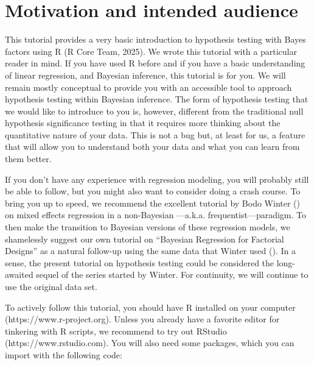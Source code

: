 \documentclass[
  doc,
  floatsintext,
  longtable,
  nolmodern,
  notxfonts,
  notimes,
  colorlinks=true,linkcolor=blue,citecolor=blue,urlcolor=blue]{apa7}
\begin{document}
\section{Motivation and intended
audience}\label{motivation-and-intended-audience}

This tutorial provides a very basic introduction to hypothesis testing
with Bayes factors using R (R Core Team, 2025). We wrote this tutorial
with a particular reader in mind. If you have used R before and if you
have a basic understanding of linear regression, and Bayesian inference,
this tutorial is for you. We will remain mostly conceptual to provide
you with an accessible tool to approach hypothesis testing within
Bayesian inference. The form of hypothesis testing that we would like to
introduce to you is, however, different from the traditional null
hypothesis significance testing in that it requires more thinking about
the quantitative nature of your data. This is not a bug but, at least
for us, a feature that will allow you to understand both your data and
what you can learn from them better.

If you don't have any experience with regression modeling, you will
probably still be able to follow, but you might also want to consider
doing a crash course. To bring you up to speed, we recommend the
excellent tutorial by Bodo Winter
() on mixed eﬀects
regression in a non-Bayesian ---a.k.a. frequentist---paradigm. To then
make the transition to Bayesian versions of these regression models, we
shamelessly suggest our own tutorial on ``Bayesian Regression for
Factorial Designs'' as a natural follow-up using the same data that
Winter used
(). In a sense, the present tutorial on hypothesis testing
could be considered the long-awaited sequel of the series started by
Winter. For continuity, we will continue to use the original data set.

To actively follow this tutorial, you should have R installed on your
computer (https://www.r-project.org). Unless you already have a favorite
editor for tinkering with R scripts, we recommend to try out RStudio
(https://www.rstudio.com). You will also need some packages, which you
can import with the following code:
\end{document}

